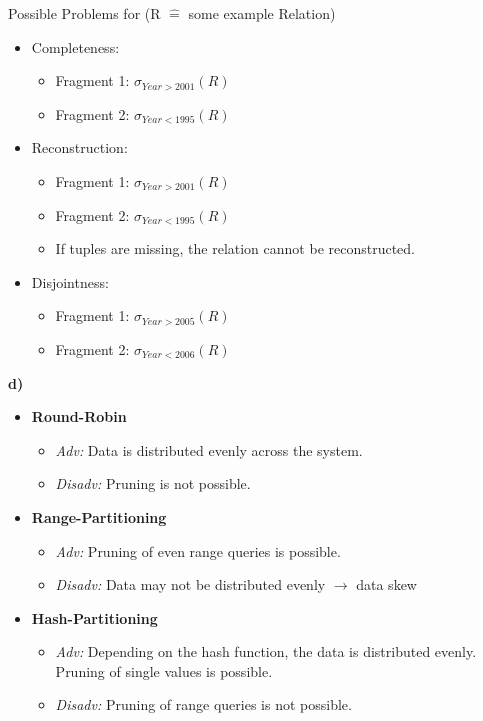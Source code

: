 \documentclass{scrartcl}
\begin{document}
Possible Problems for (R $\widehat{=}$ some example Relation)
\begin{itemize}
	\item Completeness:
	\begin{itemize}
		\item Fragment 1: $\sigma_{Year > 2001}(R)$
		\item Fragment 2: $\sigma_{Year < 1995}(R)$
	\end{itemize}

	\item Reconstruction:
	\begin{itemize}
		\item Fragment 1: $\sigma_{Year > 2001}(R)$
		\item Fragment 2: $\sigma_{Year < 1995}(R)$
		\item If tuples are missing, the relation cannot be reconstructed.
	\end{itemize}

	\item Disjointness:
	\begin{itemize}
		\item Fragment 1: $\sigma_{Year > 2005}(R)$
		\item Fragment 2: $\sigma_{Year < 2006}(R)$ 
	\end{itemize}
\end{itemize}

\newpage

\textbf{d)} 

\begin{itemize}
	\item \textbf{Round-Robin} 
	\begin{itemize}
		\item \textit{Adv:} Data is distributed evenly across the system.
		\item \textit{Disadv:} Pruning is not possible. 
	\end{itemize}
	\item \textbf{Range-Partitioning} 
	\begin{itemize}
		\item \textit{Adv:} Pruning of even range queries is possible.
		\item \textit{Disadv:} Data may not be distributed evenly $\longrightarrow$ data skew
	\end{itemize}
	\item \textbf{Hash-Partitioning} 
	\begin{itemize}
		\item \textit{Adv:} Depending on the hash function, the data is distributed evenly. Pruning of single values is possible.
		\item \textit{Disadv:} Pruning of range queries is not possible. 
	\end{itemize}
\end{itemize}
\end{document}
